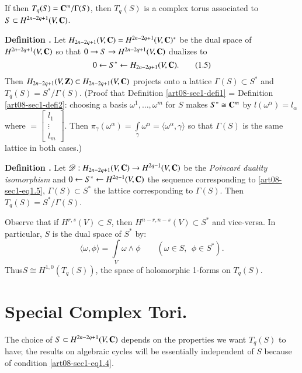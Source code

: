 If then $T_{q}(S)=\mathbf{C}^{m}/\Gamma(S)$, then $T_{q}(S)$ is a complex torus associated to $S\subset H^{2n-2q+1}(V,\mathbf{C})$.

\medskip
\noindent
{\bf Definition .\label{art08-sec1-defi2}}
Let $H_{2n-2q+1}(V,\mathbf{C})=H^{2n-2q+1}(V,\mathbf{C})^{*}$ be the dual space of $H^{2n-2q+1}(V,\mathbf{C})$ so that $0\to S\to H^{2n-2q+1}(V,\mathbf{C})$ dualizes to 
\begin{equation*}
0\leftarrow S^{*}\leftarrow H_{2n-2q+1}(V,\mathbf{C}).\tag{1.5}\label{art08-sec1-eq1.5}
\end{equation*}
Then $H_{2n-2q+1}(V,\mathbf{Z})\subset H_{2n-2q+1}(V,\mathbf{C})$ projects onto a lattice $\Gamma(S)\subset S^{*}$ and $T_{q}(S)=S^{*}/\Gamma(S)$. (Proof that Definition \ref{art08-sec1-defi1} = Definition \ref{art08-sec1-defi2}: choosing a basis $\omega^{1},\ldots,\omega^{m}$ for $S$ makes $S^{*}\cong \mathbf{C}^{m}$ by $l(\omega^{\alpha})=l_{\alpha}$ where $=\left[\begin{smallmatrix} l_{1}\\ \vdots \\ l_{m}\end{smallmatrix}\right]$. Then $\pi_{\gamma}(\omega^{\alpha})=\int\limits_{\gamma}\omega^{\alpha}=\langle \omega^{\alpha},\gamma\rangle$ so that $\Gamma(S)$ is the same lattice in both cases.)

\medskip
\noindent
{\bf Definition .\label{art08-sec1-defi3}}
Let $\mathscr{D}:H_{2n-2q+1}(V,\mathbf{C})\to H^{2q-1}(V,\mathbf{C})$ be the {\em Poincar\'e duality isomorphism} and $0\leftarrow S^{*}\leftarrow H^{2q-1}(V,\mathbf{C})$ the sequence corresponding to \eqref{art08-sec1-eq1.5}, $\Gamma(S)\subset S^{*}$ the lattice corresponding to $\Gamma(S)$. Then $T_{q}(S)=S^{*}/\Gamma(S)$.
\smallskip

Observe that if $H^{r,s}(V)\subset S$, then $H^{n-r,n-s}(V)\subset S^{*}$ and vice-versa. In particular, $S$ is the dual space of $S^{*}$ by:
\begin{equation*}
\langle \omega,\phi\rangle =\int\limits_{V}\omega\wedge \phi\qquad (\omega\in S, \ \ \phi\in S^{*}).\tag{1.6}\label{art08-sec1-eq1.6}
\end{equation*}
Thus\pageoriginale $S\cong H^{1,0}(T_{q}(S))$, the space of holomorphic 1-forms on $T_{q}(S)$.

\section{Special Complex Tori.}\label{art08-sec2}

The choice of $S\subset H^{2n-2q+1}(V,\mathbf{C})$ depends on the properties we want $T_{q}(S)$ to have; the results on algebraic cycles will be essentially independent of $S$ because of condition \eqref{art08-sec1-eq1.4}.

